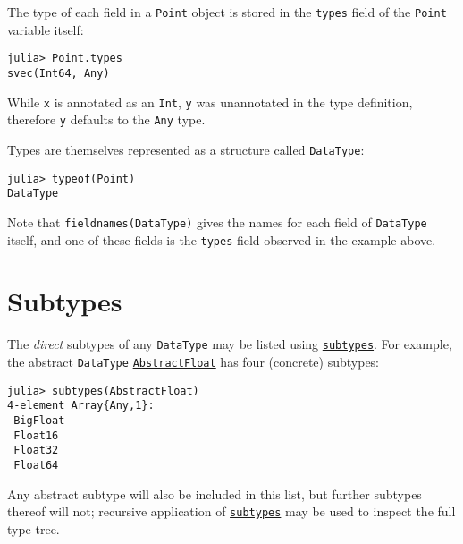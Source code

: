 The type of each field in a \texttt{Point} object is stored in the \texttt{types} field of the \texttt{Point} variable itself:




\begin{verbatim}
julia> Point.types
svec(Int64, Any)
\end{verbatim}



While \texttt{x} is annotated as an \texttt{Int}, \texttt{y} was unannotated in the type definition, therefore \texttt{y} defaults to the \texttt{Any} type.



Types are themselves represented as a structure called \texttt{DataType}:




\begin{verbatim}
julia> typeof(Point)
DataType
\end{verbatim}



Note that \texttt{fieldnames(DataType)} gives the names for each field of \texttt{DataType} itself, and one of these fields is the \texttt{types} field observed in the example above.



\hypertarget{11371291537025953368}{}


\section{Subtypes}



The \emph{direct} subtypes of any \texttt{DataType} may be listed using \hyperlink{13112219412833772146}{\texttt{subtypes}}. For example, the abstract \texttt{DataType} \hyperlink{11465394427882483091}{\texttt{AbstractFloat}} has four (concrete) subtypes:




\begin{verbatim}
julia> subtypes(AbstractFloat)
4-element Array{Any,1}:
 BigFloat
 Float16
 Float32
 Float64
\end{verbatim}



Any abstract subtype will also be included in this list, but further subtypes thereof will not; recursive application of \hyperlink{13112219412833772146}{\texttt{subtypes}} may be used to inspect the full type tree.



